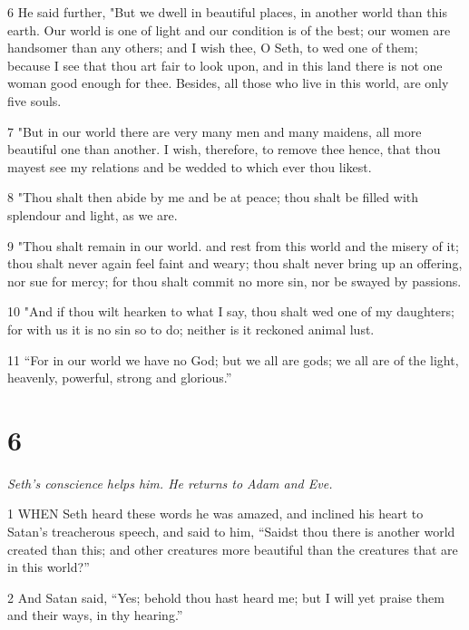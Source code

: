 \par 6 He said further, "But we dwell in beautiful places, in another world than this earth. Our world is one of light and our condition is of the best; our women are handsomer than any others; and I wish thee, O Seth, to wed one of them; because I see that thou art fair to look upon, and in this land there is not one woman good enough for thee. Besides, all those who live in this world, are only five souls.

\par 7 "But in our world there are very many men and many maidens, all more beautiful one than another. I wish, therefore, to remove thee hence, that thou mayest see my relations and be wedded to which ever thou likest.

\par 8 "Thou shalt then abide by me and be at peace; thou shalt be filled with splendour and light, as we are.

\par 9 "Thou shalt remain in our world. and rest from this world and the misery of it; thou shalt never again feel faint and weary; thou shalt never bring up an offering, nor sue for mercy; for thou shalt commit no more sin, nor be swayed by passions.

\par 10 "And if thou wilt hearken to what I say, thou shalt wed one of my daughters; for with us it is no sin so to do; neither is it reckoned animal lust.

\par 11 “For in our world we have no God; but we all are gods; we all are of the light, heavenly, powerful, strong and glorious.”

\chapter{6}

\par \textit{Seth's conscience helps him. He returns to Adam and Eve.}

\par 1 WHEN Seth heard these words he was amazed, and inclined his heart to Satan's treacherous speech, and said to him, “Saidst thou there is another world created than this; and other creatures more beautiful than the creatures that are in this world?”

\par 2 And Satan said, “Yes; behold thou hast heard me; but I will yet praise them and their ways, in thy hearing.”

